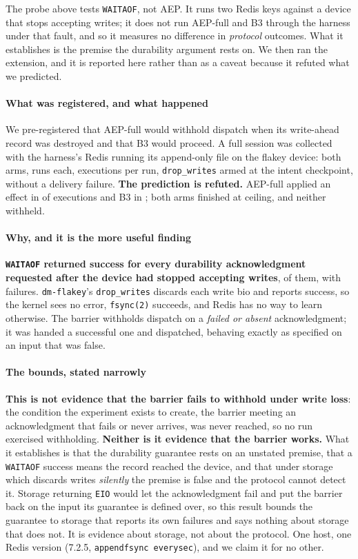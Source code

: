 The probe above tests \texttt{WAITAOF}, not AEP. It runs two Redis keys against
a device that stops accepting writes; it does not run AEP-full and B3 through
the harness under that fault, and so it measures no difference in \emph{protocol}
outcomes. What it establishes is the premise the durability argument rests on.
We then ran the extension, and it is reported here rather than as a caveat
because it refuted what we predicted.

\paragraph{What was registered, and what happened} We pre-registered that
AEP-full would withhold dispatch when its write-ahead record was destroyed and
that B3 would proceed. A full session was collected with the harness's Redis
running its append-only file on the flakey device: both arms,
\WriteLossRunsPerArm{} runs each, \WriteLossExecPerRun{} executions per run,
\texttt{drop\_writes} armed at the intent checkpoint, without a delivery
failure. \textbf{The prediction is refuted.} AEP-full applied an effect in
\WriteLossAepApplied{} of \WriteLossExecPerArm{} executions and B3 in
\WriteLossBthreeApplied{}; both arms finished at ceiling, and neither withheld.

\paragraph{Why, and it is the more useful finding} \textbf{\texttt{WAITAOF}
returned success for every durability acknowledgment requested after the device
had stopped accepting writes}, \WriteLossAcksAfterFault{} of them, with
\WriteLossAckFailures{} failures. \texttt{dm-flakey}'s \texttt{drop\_writes}
discards each write bio and reports success, so the kernel sees no error,
\texttt{fsync(2)} succeeds, and Redis has no way to learn otherwise. The barrier
withholds dispatch on a \emph{failed or absent} acknowledgment; it was handed a
successful one and dispatched, behaving exactly as specified on an input that
was false.

\paragraph{The bounds, stated narrowly} \textbf{This is not evidence that the
barrier fails to withhold under write loss}: the condition the experiment exists
to create, the barrier meeting an acknowledgment that fails or never arrives,
was never reached, so no run exercised withholding. \textbf{Neither is it
evidence that the barrier works.} What it establishes is that the durability
guarantee rests on an unstated premise, that a \texttt{WAITAOF} success means
the record reached the device, and that under storage which discards writes
\emph{silently} the premise is false and the protocol cannot detect it. Storage
returning \texttt{EIO} would let the acknowledgment fail and put the barrier
back on the input its guarantee is defined over, so this result bounds the
guarantee to storage that reports its own failures and says nothing about
storage that does not. It is evidence about storage, not about the protocol. One
host, one Redis version (7.2.5, \texttt{appendfsync everysec}), and we claim it
for no other.

